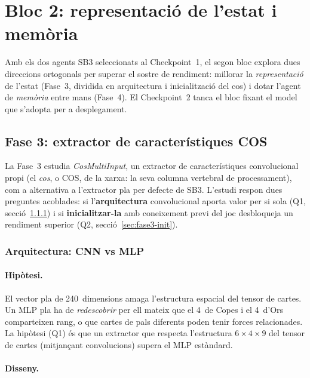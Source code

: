 ﻿%

\section{Bloc 2: representació de l'estat i memòria}
\label{sec:bloc2}

Amb els dos agents \ac{SB3} seleccionats al Checkpoint~1, el segon bloc explora dues
direccions ortogonals per superar el sostre de rendiment: millorar la \emph{representació}
de l'estat (Fase~3, dividida en arquitectura i inicialització del cos) i dotar l'agent de
\emph{memòria} entre mans (Fase~4). El Checkpoint~2 tanca el bloc fixant el model que
s'adopta per a desplegament.

\subsection{Fase 3: extractor de característiques COS}
\label{sec:fase3}

\begin{sloppypar}
La Fase~3 estudia \emph{CosMultiInput}, un extractor de característiques convolucional
propi (el \emph{cos}, o COS, de la xarxa: la seva columna vertebral de processament),
com a alternativa a l'extractor pla per defecte de \ac{SB3}.
L'estudi respon dues preguntes acoblades: si l'\textbf{arquitectura} convolucional
aporta valor per si sola (Q1, secció~\ref{sec:fase3-arq}) i si
\textbf{inicialitzar-la} amb coneixement previ del joc desbloqueja un rendiment
superior (Q2, secció~\ref{sec:fase3-init}).
\end{sloppypar}

\subsubsection{Arquitectura: CNN vs MLP}
\label{sec:fase3-arq}

\paragraph{Hipòtesi.} El vector pla de 240~dimensions amaga l'estructura espacial del
tensor de cartes. Un \ac{MLP} pla ha de \emph{redescobrir} per ell mateix que el 4~de
Copes i el 4~d'Ors comparteixen rang, o que cartes de pals diferents poden tenir forces
relacionades. La hipòtesi (Q1) és que un extractor que respecta l'estructura
\(6 \times 4 \times 9\) del tensor de cartes (mitjançant convolucions) supera el \ac{MLP}
estàndard.

\paragraph{Disseny.}

